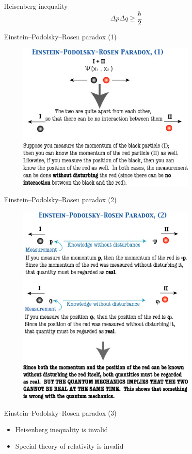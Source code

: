 \documentclass[10pt,pdf,hyperref={unicode}]{beamer}
\begin{document}
\begin{frame}{Heisenberg inequality}
  \[
  \Delta p \Delta q \ge \frac{\hbar}{2}
  \]
\end{frame}

\begin{frame}{Einstein–Podolsky–Rosen paradox (1)}
 \begin{figure} 
   \includegraphics[width=90mm,scale=0.5]{epr1.jpg}
  \end{figure}
\end{frame}

\begin{frame}{Einstein–Podolsky–Rosen paradox (2)}
 \begin{figure} 
   \includegraphics[width=90mm,scale=0.5]{epr2.jpg}
  \end{figure}
\end{frame}

\begin{frame}{Einstein–Podolsky–Rosen paradox (3)}
  \begin{itemize}
  \item Heisenberg inequality is invalid
  \item Special theory of relativity is invalid
  \end{itemize}
\end{frame}
\end{document}
